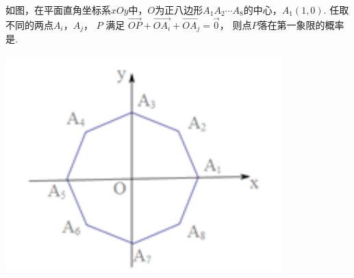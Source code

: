 \documentclass[12pt,space]{ctexart} %
\begin{document}
\begin{enumerate}[itemsep=-0.3em,topsep=0pt]
  \begin{minipage}[h][4em][t]{.7\textwidth}
    \item 如图，在平面直角坐标系$xOy$中，$O$为正八边形$A_1A_2\cdots A_8$的中心，$A_1(1,0)$. 任取不同的两点$A_i$，$A_j$，
    $P$ 满足 $\overrightarrow{OP} + \overrightarrow{OA_i} + \overrightarrow{OA_j} = \overrightarrow{0}$，
    则点$P$落在第一象限的概率是.
  \end{minipage}
  \begin{minipage}[h][35pt][t]{.25\textwidth}
    \centering\includegraphics[width=0.8\textwidth]{Image/sh-14.png}
  \end{minipage}

\end{enumerate}
\end{document}
